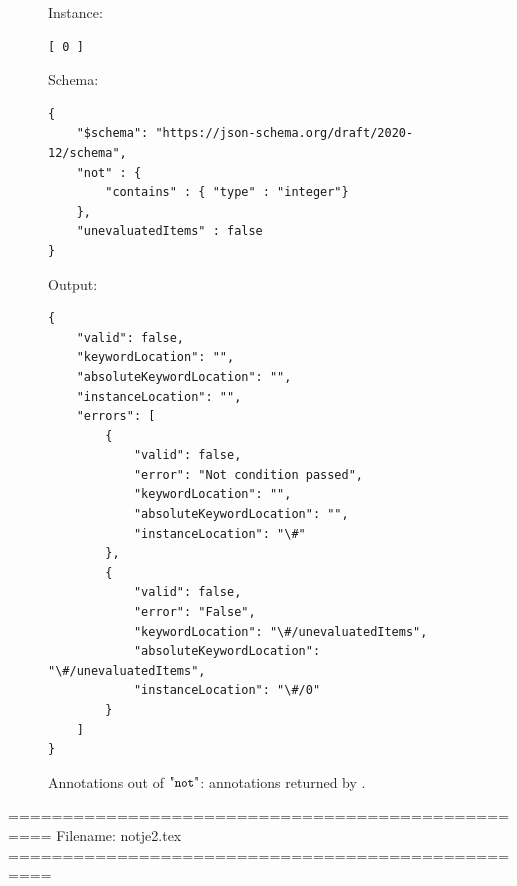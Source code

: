 \begin{figure}
\small

Instance:
\begin{querybox}{}
\begin{lstlisting}[style=querynonumbers]
[ 0 ]
\end{lstlisting}
\end{querybox}


Schema:
\begin{querybox}{}
\begin{lstlisting}[style=query]
{
	"$schema": "https://json-schema.org/draft/2020-12/schema",
	"not" : {
	    "contains" : { "type" : "integer"}
	},
	"unevaluatedItems" : false
}
\end{lstlisting}
\end{querybox}
 
Output:
\begin{querybox}{}
\begin{lstlisting}[style=query]
{
	"valid": false,
	"keywordLocation": "",
	"absoluteKeywordLocation": "",
	"instanceLocation": "",
	"errors": [
		{
			"valid": false,
			"error": "Not condition passed",
			"keywordLocation": "",
			"absoluteKeywordLocation": "",
			"instanceLocation": "\#"
		},
		{
			"valid": false,
			"error": "False",
			"keywordLocation": "\#/unevaluatedItems",
			"absoluteKeywordLocation": "\#/unevaluatedItems",
			"instanceLocation": "\#/0"
		}
	]
}
\end{lstlisting}
\end{querybox}

\caption{Annotations out of $\qnot$: annotations returned by {\BL}.}
\label{fig:notbl}
\end{figure}



==================================================
Filename: notje2.tex
==================================================

